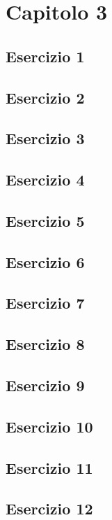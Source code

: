 \section{Capitolo 3}
\subsection{Esercizio 1}

\subsection{Esercizio 2}

\subsection{Esercizio 3}

\subsection{Esercizio 4}

\subsection{Esercizio 5}

\subsection{Esercizio 6}

\subsection{Esercizio 7}

\subsection{Esercizio 8}

\subsection{Esercizio 9}

\subsection{Esercizio 10}

\subsection{Esercizio 11}

\subsection{Esercizio 12}

